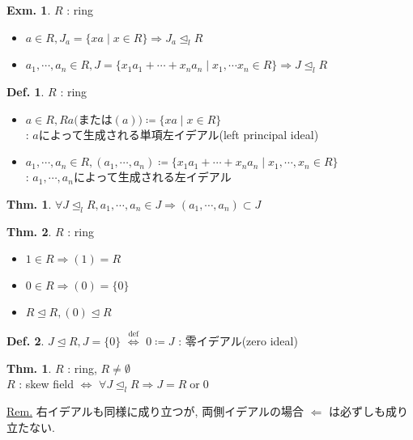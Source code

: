 \documentclass[uplatex,dvipdfmx,9pt]{beamer}
\newcommand{\defarrow}{\overset{\mathrm{def}}{\Leftrightarrow}}
\newcommand{\lideal}{\trianglelefteq_l}
\newcommand{\ideal}{\trianglelefteq}
\newcounter{textThmCount}
\newcounter{textExmCount}
\theoremstyle{definition} %
\newtheorem{defn}{Def.}[subsection] %
\newtheorem{thm}{Thm.}[subsection] %
\newtheorem{thmText}[textThmCount]{Thm.}
\theoremstyle{example}
\newtheorem{exmText}[textExmCount]{Exm.}
\begin{document}
    \begin{frame}

      \begin{exmText}
        $R$ : ring
        \begin{itemize}
          \item $a \in R, J_a = \{xa \mid x \in R\} \Rightarrow J_a \lideal R$
          \item $a_1, \cdots, a_n \in R, J = \{x_1a_1 + \cdots + x_na_n \mid x_1, \cdots x_n \in R\} \Rightarrow J \lideal R$
        \end{itemize}
      \end{exmText}

      \begin{defn}
        $R$ : ring
        \begin{itemize}
          \item $a \in R, Ra \text{(または$(a)$)} \coloneqq \{xa \mid x \in R\}$ \\
                : $a$によって\alert{生成}される\alert{単項左イデアル(left principal ideal)}
          \item $a_1, \cdots, a_n \in R, (a_1, \cdots, a_n) \coloneqq \{x_1a_1 + \cdots + x_na_n \mid x_1, \cdots, x_n \in R\}$ \\
                : $a_1, \cdots, a_n$によって\alert{生成}される左イデアル
        \end{itemize}
      \end{defn}

      \begin{thm}
        $\forall J \lideal R, a_1, \cdots, a_n \in J \Rightarrow (a_1, \cdots, a_n) \subset J$
      \end{thm}

    \end{frame}

    \begin{frame}

       \begin{thm}
        $R$ : ring
        \begin{itemize}
          \item $1 \in R \Rightarrow (1) = R$
          \item $0 \in R \Rightarrow (0) = \{0\}$
          \item $R \ideal R, (0) \ideal R$
        \end{itemize}
      \end{thm}

      \begin{defn}
        $J \ideal R, J = \{0\}$ $\defarrow$ $0 \coloneqq J$ : \alert{零イデアル(zero ideal)}
      \end{defn}

      \begin{thmText}
        $R$ : ring, $R \neq \emptyset$ \\
        $R$ : skew field $\Leftrightarrow$ $\forall J \lideal R \Rightarrow J = R \; \text{or} \; 0$
      \end{thmText}
      \underline{Rem.} 右イデアルも同様に成り立つが, 両側イデアルの場合 $\Leftarrow$ は必ずしも成り立たない.

    \end{frame}
\end{document}
